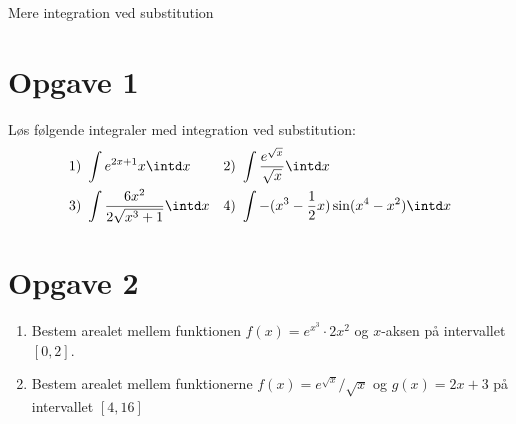 
\begin{center}
\Huge
Mere integration ved substitution
\end{center}

\section*{Opgave 1}
Løs følgende integraler med integration ved substitution:
\begin{align*}
&1)   \  \int e^{2x+1}x \intd x  &&2) \ \int \frac{e^{\sqrt{x}}}{\sqrt{x}} \intd x   \\
&3)   \   \int \frac{6x^2}{2\sqrt{x^3+1}} \intd x &&4) \  \int -(x^3-\frac{1}{2}x)\sin(x^4-x^2) \intd x   \\
\end{align*}
\section*{Opgave 2}
\begin{enumerate}[label=\roman*)]
\item Bestem arealet mellem funktionen $f(x) = e^{x^3}\cdot 2x^2$ og $x$-aksen på intervallet $[0,2]$.
\item Bestem arealet mellem funktionerne $f(x) = e^{\sqrt{x}}/\sqrt{x}$ og $g(x) = 2x+3$ på intervallet $[4,16]$
\end{enumerate}